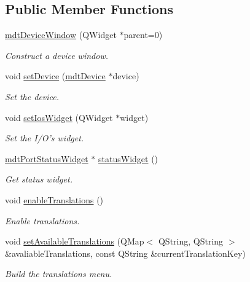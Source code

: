 \subsection*{Public Member Functions}
\begin{DoxyCompactItemize}
\item 
\hyperlink{classmdt_device_window_a92771aaaa091fa653e3c3776b7e115a0}{mdtDeviceWindow} (QWidget $\ast$parent=0)
\begin{DoxyCompactList}\small\item\em Construct a device window. \end{DoxyCompactList}\item 
void \hyperlink{classmdt_device_window_ac3bed35b2eeb88b2483c18e3b9bb918d}{setDevice} (\hyperlink{classmdt_device}{mdtDevice} $\ast$device)
\begin{DoxyCompactList}\small\item\em Set the device. \end{DoxyCompactList}\item 
\hypertarget{classmdt_device_window_a63df49a9f0cafc2f72e097aa0cf26baa}{
void \hyperlink{classmdt_device_window_a63df49a9f0cafc2f72e097aa0cf26baa}{setIosWidget} (QWidget $\ast$widget)}
\label{classmdt_device_window_a63df49a9f0cafc2f72e097aa0cf26baa}

\begin{DoxyCompactList}\small\item\em Set the I/O's widget. \end{DoxyCompactList}\item 
\hyperlink{classmdt_port_status_widget}{mdtPortStatusWidget} $\ast$ \hyperlink{classmdt_device_window_a5bad625542c9df270d31d4beec4c9e95}{statusWidget} ()
\begin{DoxyCompactList}\small\item\em Get status widget. \end{DoxyCompactList}\item 
void \hyperlink{classmdt_device_window_a8b884e389fa27f85742642193d18b8f9}{enableTranslations} ()
\begin{DoxyCompactList}\small\item\em Enable translations. \end{DoxyCompactList}\item 
\hypertarget{classmdt_device_window_a781a7511b7fbf586fcd39e2aa44e91fd}{
void \hyperlink{classmdt_device_window_a781a7511b7fbf586fcd39e2aa44e91fd}{setAvailableTranslations} (QMap$<$ QString, QString $>$ \&avaliableTranslations, const QString \&currentTranslationKey)}
\label{classmdt_device_window_a781a7511b7fbf586fcd39e2aa44e91fd}

\begin{DoxyCompactList}\small\item\em Build the translations menu. \end{DoxyCompactList}\end{DoxyCompactItemize}
